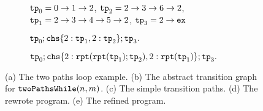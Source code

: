 {\begin{figure}
{\begin{subfigure}{.95\textwidth}
\begin{centering}
    $\mathtt{tp}_0 = 0 \to 1 \to 2$,
    $\mathtt{tp}_2 = 2 \to 3 \to 6 \to 2$, 
    $\mathtt{tp}_1 = 2 \to 3 \to 4 \to 5 \to 2$,
    $\mathtt{tp}_3 = 2 \to \mathtt{ex}$
    \caption{}
\end{centering}
\end{subfigure}
}
{
\begin{subfigure}{.4\textwidth}
\begin{centering}
$
\tpath_0; 
\rpchoose{ 2: \tpath_1, 2: \tpath_2 }; \tpath_3.
$
\caption{}
\end{centering}
\end{subfigure}
}
\begin{subfigure}{.5\textwidth}
  \begin{centering}
  $
  \tpath_0 ; 
  \rpchoose{2: \rprepeat(\rprepeat(\tpath_1); \tpath_2), 
  2: \rprepeat(\tpath_1)}; \tpath_3.
  $
  \caption{}
\end{centering}
  \end{subfigure}
  \vspace{-0.4cm}
\caption{
(a) The two paths loop example.
(b) The abstract transition graph for $\mathtt{twoPathsWhile}(n, m)$.
(c) The simple transition paths.
(d) The rewrote program.
(e) The refined program.}
    \label{fig:whileTwoCounters-refine}
\end{figure}
}
